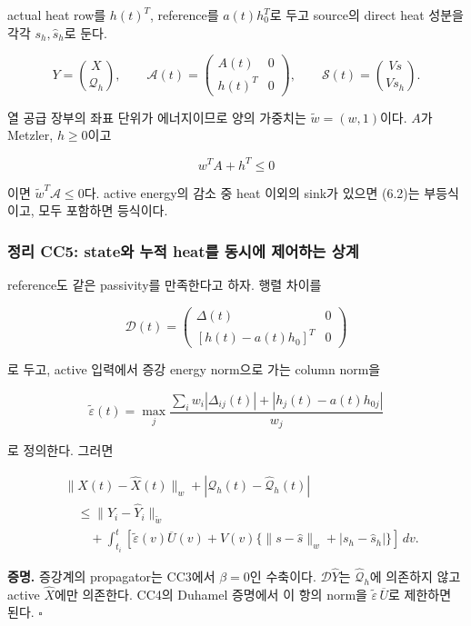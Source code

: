 actual heat row를 \(h(t)^T\), reference를 \(a(t)h_0^T\)로 두고 source의 direct heat 성분을 각각 \(s_h,\widehat s_h\)로 둔다.

\[
Y=\binom{X}{\mathcal Q_h},\qquad
\mathcal A(t)=
\begin{pmatrix}A(t)&0\\h(t)^T&0\end{pmatrix},
\qquad
\mathcal S(t)=\binom{Vs}{Vs_h}.
\tag{6.1}
\]

열 공급 장부의 좌표 단위가 에너지이므로 양의 가중치는 \(\widetilde w=(w,1)\)이다. \(A\)가 Metzler, \(h\ge0\)이고

\[
w^TA+h^T\le0
\tag{6.2}
\]

이면 \(\widetilde w^T\mathcal A\le0\)다. active energy의 감소 중 heat 이외의 sink가 있으면 (6.2)는 부등식이고, 모두 포함하면 등식이다.

\hypertarget{uxc815uxb9ac-cc5-stateuxc640-uxb204uxc801-heatuxb97c-uxb3d9uxc2dcuxc5d0-uxc81cuxc5b4uxd558uxb294-uxc0c1uxacc4}{%
\subsubsection{정리 CC5: state와 누적 heat를 동시에 제어하는 상계}\label{uxc815uxb9ac-cc5-stateuxc640-uxb204uxc801-heatuxb97c-uxb3d9uxc2dcuxc5d0-uxc81cuxc5b4uxd558uxb294-uxc0c1uxacc4}}

reference도 같은 passivity를 만족한다고 하자. 행렬 차이를

\[
\mathcal D(t)=
\begin{pmatrix}
\Delta(t)&0\\
[h(t)-a(t)h_0]^T&0
\end{pmatrix}
\tag{6.3}
\]

로 두고, active 입력에서 증강 energy norm으로 가는 column norm을

\[
\widetilde\varepsilon(t)=
\max_j\frac{\sum_iw_i|\Delta_{ij}(t)|
+|h_j(t)-a(t)h_{0j}|}{w_j}
\tag{6.4}
\]

로 정의한다. 그러면

\[
\boxed{
\begin{aligned}
&\|X(t)-\widehat X(t)\|_w
+|\mathcal Q_h(t)-\widehat{\mathcal Q}_h(t)|\\
&\quad\le
\|Y_i-\widehat Y_i\|_{\widetilde w}\\
&\qquad+
\int_{t_i}^{t}
\left[\widetilde\varepsilon(v)\overline U(v)
+V(v)\{\|s-\widehat s\|_w+|s_h-\widehat s_h|\}\right]\,dv.
\end{aligned}
}
\tag{6.5}
\]

\textbf{증명.} 증강계의 propagator는 CC3에서 \(\beta=0\)인 수축이다. \(\mathcal D\widehat Y\)는 \(\widehat{\mathcal Q}_h\)에 의존하지 않고 active \(\widehat X\)에만 의존한다. CC4의 Duhamel 증명에서 이 항의 norm을 \(\widetilde\varepsilon\,\overline U\)로 제한하면 된다. \(\square\)

